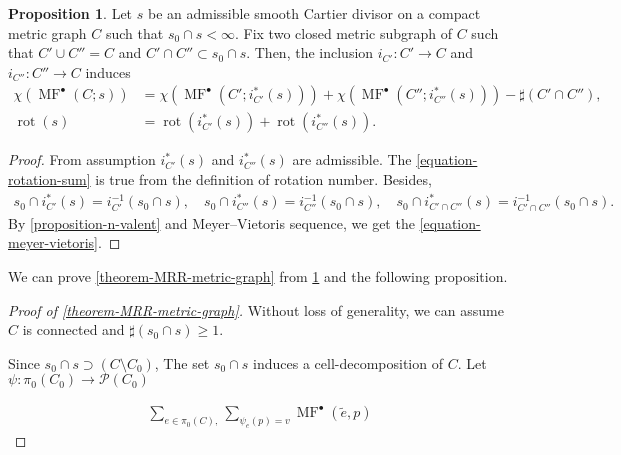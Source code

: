 \documentclass[a4paper,dvipdfmx,reqno,12pt]{amsart}
\theoremstyle{definition}
\newtheorem{proposition}[theorem]{Proposition}
\newcommand{\opn}[1]{\operatorname{#1}}
\numberwithin{equation}{section}
\begin{document}
\begin{proposition}
\label{proposition-gluing-formula}
Let $s$ be an admissible smooth Cartier divisor on a
compact metric graph $C$ such that $s_0\cap s<\infty$.
Fix two closed metric subgraph of $C$ such that
$C' \cup C''=C$ and $C'\cap C''\subset s_0 \cap s$.
Then, 
the inclusion $i_{C'}\colon C'\to C$ 
and $i_{C''}\colon C''\to C$ induces
\begin{align}
\label{equation-meyer-vietoris}
\chi(\opn{MF}^{\bullet}(C;s))
&=\chi(\opn{MF}^{\bullet}(C';i_{C'}^{*}(s)))
+\chi(\opn{MF}^{\bullet}(C'';i_{C''}^{*}(s)))
-\sharp(C'\cap C''), \\
\label{equation-rotation-sum}
\opn{rot}(s)&=\opn{rot}(i_{C'}^{*}(s))
+\opn{rot}(i_{C''}^{*}(s)).
\end{align}
\end{proposition}
\begin{proof}
From assumption $i^{*}_{C'}(s)$ and 
$i^{*}_{C''}(s)$ are admissible.
The \cref{equation-rotation-sum} is true from
the definition of rotation number. 
 Besides,
\begin{align}
s_0\cap i^{*}_{C'}(s)=i^{-1}_{C'}(s_0\cap s), \quad 
s_0\cap i^{*}_{C''}(s)=i^{-1}_{C''}(s_0\cap s), \quad
s_0\cap i^{*}_{C'\cap C''}(s)=
i^{-1}_{C'\cap C''}(s_0\cap s).
\end{align}
By \cref{proposition-n-valent} 
and Meyer--Vietoris sequence, we get 
the \cref{equation-meyer-vietoris}.
\end{proof}

We can prove \cref{theorem-MRR-metric-graph} from
\cref{proposition-gluing-formula} and the following
proposition.







\begin{proof}[{Proof of \cref{theorem-MRR-metric-graph}}]
Without loss of generality, we can assume $C$ is 
connected and $\sharp (s_0\cap s)\geq 1$.

Since $s_0\cap s\supset (C\setminus C_0)$, 
The set $s_0\cap s$ induces a cell-decomposition of 
$C$. Let 
$\psi \colon \pi_0 (C_0)\to \mathcal{P}(C_0)$

\begin{align}
\sum_{e\in \pi_0(C),}
\sum_{\psi_e(p)=v} 
\opn{MF}^{\bullet}(\tilde{e},p)
\end{align}

\end{proof}
\end{document}

